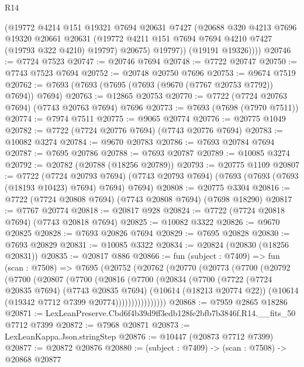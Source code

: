 \begin{lexlean}{R14}
\begin{coremodule}
            (@19772
              @4214
              @151
              @19321
              @7694
              @20631
              @7427
              (@20688
                @320
                @4213
                @7696
                @19320
                @20661
                @20631
                (@19772 @4211 @151 @7694 @7694 @4210 @7427 (@19793 @322 @4210) @19797)
                @20675)
              @19797))
          (@19191 @19326))))
@20746 := @7724 @7523
@20747 := @20746 @7694
@20748 := @7722 @20747
@20750 := @7743 @7523 @7694
@20752 := @20748 @20750 @7696
@20753 := @9674 @7519
@20762 := @7693 (@7693 (@7695 (@7693 (@9670 (@7767 @20753 @7792)) @7694)) @7694)
@20763 := @12865 @20753
@20770 := @7722 (@7724 @20763 @7694) (@7743 @20763 @7694) @7696
@20773 := @7693 (@7698 (@7970 @7511))
@20774 := @7974 @7511
@20775 := @9065 @20774
@20776 := @20775 @1049
@20782 := @7722 (@7724 @20776 @7694) (@7743 @20776 @7694)
@20783 := @10082 @3274
@20784 := @9670 @20783
@20786 := @7693 @20784 @7694
@20787 := @7695 @20786
@20788 := @7693 @20787
@20789 := @10085 @3274
@20792 := @20782 (@20788 (@18256 @20789))
@20793 := @20775 @1109
@20807 := @7722
    (@7724 @20793 @7694)
    (@7743 @20793 @7694)
    (@7693 (@7693 (@7693 (@18193 @10423) @7694) @7694) @7694)
@20808 := @20775 @3304
@20816 := @7722 (@7724 @20808 @7694) (@7743 @20808 @7694) (@7698 @18290)
@20817 := @7767 @20774
@20818 := @20817 @928
@20824 := @7722 (@7724 @20818 @7694) (@7743 @20818 @7694)
@20825 := @10082 @3322
@20826 := @9670 @20825
@20828 := @7693 @20826 @7694
@20829 := @7695 @20828
@20830 := @7693 @20829
@20831 := @10085 @3322
@20834 := @20824 (@20830 (@18256 @20831))
@20835 := @20817 @886
@20866 := fun (subject : @7409) =>
  fun (scan : @7508) =>
  @7695
    (@20752
      (@20762
        (@20770
          (@20773
            (@7700
              (@20792
                (@7700
                  (@20807
                    (@7700
                      (@20816
                        (@7700
                          (@20834
                            (@7700
                              (@7722
                                (@7724 @20835 @7694)
                                (@7743 @20835 @7694)
                                (@10614 (@18213 @20774 @22))
                                (@10614 (@19342 @7712 @7399 @20774))))))))))))))))
@20868 := @7959 @2865 @18286
@20871 := LexLeanPreserve.Cbd6f4b39d9ff3edb128fe2bfb7b3846f.R14.__fits_50 @7712 @7399
@20872 := @7968 @20871
@20873 := LexLeanKappa.Json.stringStep
@20876 := @10447 (@20873 @7712 @7399)
@20877 := @20872 @20876
@20880 := (subject : @7409) -> (scan : @7508) -> @20868 @20877

\end{coremodule}
\end{lexlean}
